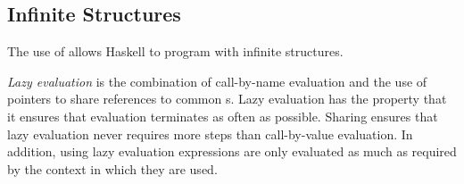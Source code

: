 \subsection{Infinite Structures}\label{subsec:Infinite_Structures}
The use of  allows Haskell to program with infinite structures.

\begin{definition}\label{def:Lazy_Evaluation}
  \emph{Lazy evaluation} is the combination of call-by-name evaluation and the use of pointers to share references to common s.
  Lazy evaluation has the property that it ensures that evaluation terminates as often as possible.
  Sharing ensures that lazy evaluation never requires more steps than call-by-value evaluation.
  In addition, using lazy evaluation expressions are only evaluated as much as required by the context in which they are used.
\end{definition}


